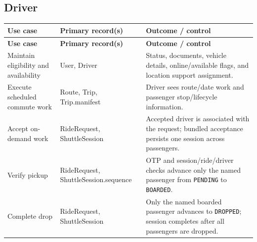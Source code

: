 \documentclass[11pt,a4paper]{article}
\newcommand{\code}[1]{\texttt{#1}}
\begin{document}
\subsection{Driver}
\begin{longtable}{p{} p{} Z}
\toprule
\textbf{Use case} & \textbf{Primary record(s)} & \textbf{Outcome / control} \\
\midrule
\endfirsthead
\toprule
\textbf{Use case} & \textbf{Primary record(s)} & \textbf{Outcome / control} \\
\midrule
\endhead
Maintain eligibility and availability & User, Driver & Status, documents, vehicle details, online/available flags, and location support assignment. \\
Execute scheduled commute work & Route, Trip, Trip.manifest & Driver sees route/date work and passenger stop/lifecycle information. \\
Accept on-demand work & RideRequest, ShuttleSession & Accepted driver is associated with the request; bundled acceptance persists one session across passengers. \\
Verify pickup & RideRequest, ShuttleSession.sequence & OTP and session/ride/driver checks advance only the named passenger from \code{PENDING} to \code{BOARDED}. \\
Complete drop & RideRequest, ShuttleSession & Only the named boarded passenger advances to \code{DROPPED}; session completes after all passengers are dropped. \\
\bottomrule
\end{longtable}
\end{document}
